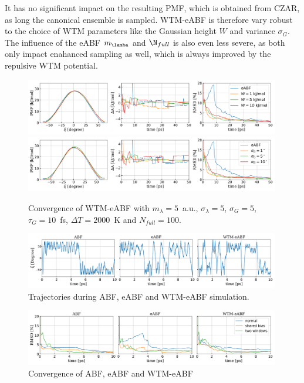 It has no significant impact on the resulting PMF, which is obtained from CZAR, as long the canonical ensemble is sampled.
WTM-eABF is therefore vary robust to the choice of WTM parameters like the Gaussian height $W$ and variance $\sigma_G$.
The influence of the eABF $m_\lamba$ and $\N_{full}$ is also even less severe, as both only impact enahanced sampling as well, which is always improved by the repulsive WTM potential.
\begin{figure}[H]
  \centering
    \includegraphics[width=0.99\textwidth]{bilder/benchmark/meta_eABF_benchmark_height}
    \includegraphics[width=0.99\textwidth]{bilder/benchmark/meta_eABF_benchmark_var}
   \caption{Convergence of WTM-eABF with $m_\lambda=5$~a.u., $\sigma_\lambda=5$, $\sigma_G=5$, $\tau_G=10$~fs, $\Delta T=2000$~K and $N_{full}=100$.}
   \label{fig:conf meABF}
\end{figure}
\begin{figure}[H]
     \centering
     \includegraphics[width=0.99\textwidth]{bilder/benchmark/ABF_trajs}
     \caption{Trajectories during ABF, eABF and WTM-eABF simulation.}
     \label{fig:traj ABF}
\end{figure}

\begin{figure}[H]
  \centering
    \includegraphics[width=0.99\textwidth]{bilder/benchmark/ABF_acc_benchmark}
   \caption{Convergence of ABF, eABF and WTM-eABF}
   \label{fig:conf ABF}
\end{figure}


